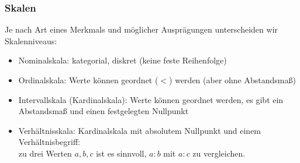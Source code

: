 \begin{frame}
  \frametitle{Skalen}
  Je nach Art eines Merkmals und möglicher Ausprägungen unterscheiden wir \alert{Skalenniveaus}:
  \begin{itemize}[<+->]
  \item Nominalskala: kategorial, diskret (keine feste Reihenfolge)
  \item Ordinalskala: Werte können geordnet ($<$) werden (aber ohne Abstandsmaß)
  \item Intervallskala (Kardinalskala): Werte können geordnet werden, es gibt ein Abstandsmaß und einen festgelegten Nullpunkt
  \item Verhältnisskala: Kardinalskala mit absolutem Nullpunkt und einem Verhältnisbegriff:\\
    zu drei Werten $a,b,c$ ist es sinnvoll, $a:b$ mit $a:c$ zu vergleichen.
  \end{itemize}

  \vfill
  
  \vspace{-1cm}
  

\vspace{-1cm}


\vspace{-1cm}



\end{frame}

